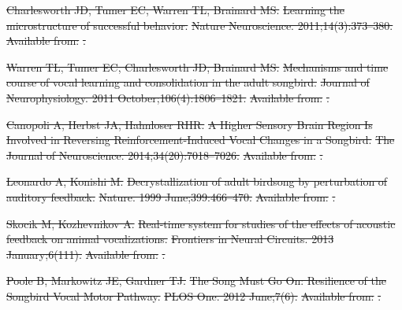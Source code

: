 \documentclass[10pt,letterpaper]{article}
\providecommand{\DIFdeltex}[1]{{\protect\color{red}\sout{#1}}}                      %
\providecommand{\DIFdel}[1]{\texorpdfstring{\DIFdeltex{#1}}{}} %
\begin{document}
\DIFdel{Charlesworth JD, Tumer EC, Warren TL, Brainard MS.
}%
\DIFdel{Learning the microstructure of successful behavior.
}%
\DIFdel{Nature Neuroscience. 2011;14(3):373--380.
}%
\DIFdel{Available from:
  }%
\DIFdel{.
}%

\DIFdel{Warren TL, Tumer EC, Charlesworth JD, Brainard MS.
}%
\DIFdel{Mechanisms and time course of vocal learning and consolidation in the
  adult songbird.
}%
\DIFdel{Journal of Neurophysiology. 2011 October;106(4):1806--1821.
}%
\DIFdel{Available from:
  }%
\DIFdel{.
}%

\DIFdel{Canopoli A, Herbst JA, Hahnloser RHR.
}%
\DIFdel{A Higher Sensory Brain Region Is Involved in Reversing
  Reinforcement-Induced Vocal Changes in a Songbird.
}%
\DIFdel{The Journal of Neuroscience. 2014;34(20):7018--7026.
}%
\DIFdel{Available from:
  }%
\DIFdel{.
}%

\DIFdel{Leonardo A, Konishi M.
}%
\DIFdel{Decrystallization of adult birdsong by perturbation of auditory
  feedback.
}%
\DIFdel{Nature. 1999 June;399:466--470.
}%
\DIFdel{Available from:
  }%
\DIFdel{.
}%

\DIFdel{Skocik M, Kozhevnikov A.
}%
\DIFdel{Real-time system for studies of the effects of acoustic feedback on
  animal vocalizations.
}%
\DIFdel{Frontiers in Neural Circuits. 2013 January;6(111).
}%
\DIFdel{Available from:
  }%
\DIFdel{.
}%

\DIFdel{Poole B, Markowitz JE, Gardner TJ.
}%
\DIFdel{The Song Must Go On: Resilience of the Songbird Vocal Motor Pathway.
}%
\DIFdel{PLOS One. 2012 June;7(6).
}%
\DIFdel{Available from:
  }%
\DIFdel{.
}%
\end{document}
